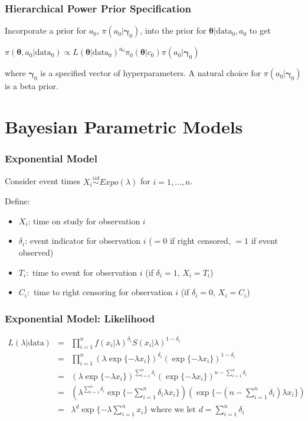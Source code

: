 \documentclass{beamer}
\begin{document}
\begin{frame}
\frametitle{Hierarchical Power Prior Specification}
Incorporate a prior for $a_0$, $\pi(a_0|\pmb{\gamma}_0)$, into the prior for $\pmb{\theta}|\text{data}_0, a_0$ to get
\begin{center}
$\pi(\pmb{\theta}, a_0|\text{data}_0) \propto L(\pmb{\theta}|\text{data}_0)^{a_0}\pi_0(\pmb{\theta}|c_{0})\pi(a_0|\pmb{\gamma}_0)$
\end{center}
where $\pmb{\gamma}_0$ is a specified vector of hyperparameters. A natural choice for $\pi(a_0|\pmb{\gamma}_0)$ is a \color{orange} beta prior\color{black}. 
\end{frame}

\section{Bayesian Parametric Models}
\begin{frame}
\frametitle{Exponential Model}
Consider event times $X_i \overset{iid}{\sim} Expo(\lambda)$ for $i = 1, \ldots, n$. 

Define:
\begin{itemize}
\item$X_i$: time on study for observation $i$
\item $\delta_i$: event indicator for observation $i$ ($=0$ if right censored, $=1$ if event observed)
\item $T_i:$ time to event for observation $i$ (if $\delta_i = 1$, $X_i = T_i$)
\item $C_i:$ time to right censoring for observation $i$ (if $\delta_i = 0$, $X_i = C_i$)
\end{itemize}
\end{frame}

\begin{frame}
\frametitle{Exponential Model: Likelihood}
\begin{eqnarray*}
L(\lambda|\text{data}) &=& \prod_{i=1}^{n} f(x_i|\lambda)^{\delta_i}S(x_i|\lambda)^{1-\delta_i} \\
&=& \prod_{i=1}^{n} (\lambda \exp\{-\lambda x_i\})^{\delta_i}(\exp\{-\lambda x_i\})^{1-\delta_i} \\
&=& (\lambda \exp\{-\lambda x_i\})^{\sum_{i=1}^{n}\delta_i}(\exp\{-\lambda x_i\})^{n-\sum_{i=1}^{n}\delta_i} \\
&=& (\lambda^{\sum_{i=1}^{n}\delta_i} \exp\{-\sum_{i=1}^{n}\delta_i\lambda x_i\})(\exp\{-(n-\sum_{i=1}^{n}\delta_i)\lambda x_i\}) \\
&=& \lambda^{d}\exp\{-\lambda \sum_{i=1}^{n}x_i\} \text{ where we let }d = \sum_{i=1}^{n}\delta_i
\end{eqnarray*}
\end{frame}
\end{document}

